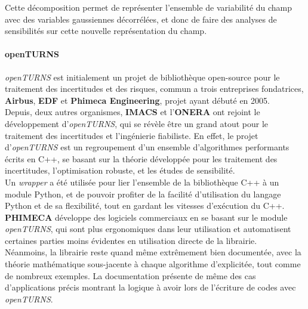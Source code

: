 \documentclass[a4paper,10pt]{article}
\begin{document}
Cette décomposition permet de représenter l'ensemble de variabilité du champ avec des variables gaussiennes décorrélées, et donc de faire des analyses de sensibilités sur cette nouvelle représentation du champ.

\paragraph{openTURNS\\}
\emph{openTURNS} est initialement un projet de bibliothèque open-source pour le traitement des incertitudes et des risques, commun a trois entreprises fondatrices, \textbf{Airbus}, \textbf{EDF} et \textbf{Phimeca Engineering}, projet ayant débuté en 2005. \\
Depuis, deux autres organismes, \textbf{IMACS} et l'\textbf{ONERA} ont rejoint le développement d'\emph{openTURNS}, qui se révèle être un grand atout pour le traitement des incertitudes et l’ingénierie fiabiliste.
En effet, le projet d'\emph{openTURNS} est un regroupement d'un ensemble d'algorithmes performants écrits en C++, se basant sur la théorie développée pour les traitement des incertitudes, l'optimisation robuste, et les études de sensibilité.\\ 
Un \textit{wrapper} a été utilisée pour lier l'ensemble de la bibliothèque C++ à un module Python, et de pouvoir profiter de la facilité d'utilisation du langage Python et de sa flexibilité, tout en gardant les vitesses d’exécution du C++.\\
\textbf{PHIMECA} développe des logiciels commerciaux en se basant sur le module \emph{openTURNS}, qui sont plus ergonomiques dans leur utilisation et automatisent certaines parties moins évidentes en utilisation directe de la librairie. \\
Néanmoins, la librairie reste quand même extrêmement bien documentée, avec la théorie mathématique sous-jacente à chaque algorithme d'explicitée, tout comme de nombreux exemples. La documentation présente de même des cas d'applications précis montrant la logique à avoir lors de l'écriture de codes avec \emph{openTURNS}.
\end{document}
